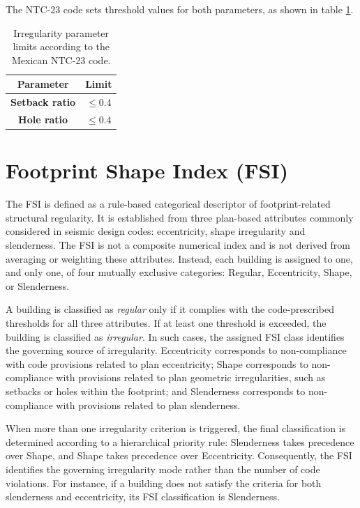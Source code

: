\begin{refsection}
The NTC-23 code sets threshold values for both parameters, as shown in table \ref{tab:MX_limits}.

\begin{table}[h]
    \centering
    \caption{Irregularity parameter limits according to the Mexican NTC-23 code.}
    \begin{tabular}{|c|c|}
        \hline
        \textbf{Parameter} & \textbf{Limit} \\
        \hline
        \textbf{Setback ratio} & $\leq 0.4$ \\
        \hline
        \textbf{Hole ratio} & $\leq 0.4$ \\
        \hline
    \end{tabular}
    \label{tab:MX_limits}
\end{table}


\renewcommand{\sectionnametext}{Footprint Shape Index (FSI)}
\renewcommand{\headingtextR}{\thesection. \sectionnametext}
\section{\sectionnametext}

The FSI is defined as a rule-based categorical descriptor of footprint-related structural regularity. It is established from three plan-based attributes commonly considered in seismic design codes: eccentricity, shape irregularity and slenderness. The FSI is not a composite numerical index and is not derived from averaging or weighting these attributes. Instead, each building is assigned to one, and only one, of four mutually exclusive categories: Regular, Eccentricity, Shape, or Slenderness.

A building is classified as \textit{regular} only if it complies with the code-prescribed thresholds for all three attributes. If at least one threshold is exceeded, the building is classified as \textit{irregular}. In such cases, the assigned FSI class identifies the governing source of irregularity. Eccentricity corresponds to non-compliance with code provisions related to plan eccentricity; Shape corresponds to non-compliance with provisions related to plan geometric irregularities, such as setbacks or holes within the footprint; and Slenderness corresponds to non-compliance with provisions related to plan slenderness.

When more than one irregularity criterion is triggered, the final classification is determined according to a hierarchical priority rule: Slenderness takes precedence over Shape, and Shape takes precedence over Eccentricity. Consequently, the FSI identifies the governing irregularity mode rather than the number of code violations. For instance, if a building does not satisfy the criteria for both slenderness and eccentricity, its FSI classification is Slenderness.


\end{refsection}
